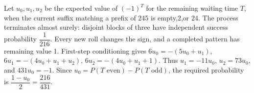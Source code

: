 Let $u_0,u_1,u_2$ be the expected value of $(-1)^T$ for the remaining waiting time $T$, when the current suffix matching a prefix of 245 is empty,2,or 24. The process terminates almost surely: disjoint blocks of three have independent success probability $\dfrac{1}{216}$. Every new roll changes the sign, and a completed pattern has remaining value 1. First-step conditioning gives $6u_0=-(5u_0+u_1)$, $6u_1=-(4u_0+u_1+u_2)$, $6u_2=-(4u_0+u_1+1)$. Thus $u_1=-11u_0$, $u_2=73u_0$, and $431u_0=-1$. Since $u_0=P(T\text{ even})-P(T\text{ odd})$, the required probability is $\dfrac{1-u_0}{2}=\boxed{\dfrac{216}{431}}$.
